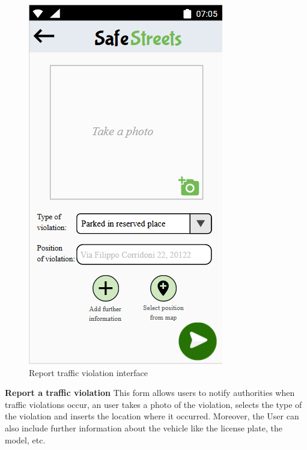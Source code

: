     \vspace{5mm}
    \begin{figure}[h]
        \centering
        \includegraphics[scale=0.8]{Images/report_violation.png}
        \caption{Report traffic violation interface}
    \end{figure}
    \vspace{5mm}
    \textbf{Report a traffic violation}\newline
    This form allows users to notify authorities when traffic violations occur, an user takes a photo of the violation, selects the type of the violation and inserts the location where it occurred. Moreover, the User can also include further information about the vehicle like the license plate, the model, etc.
    \newpage

